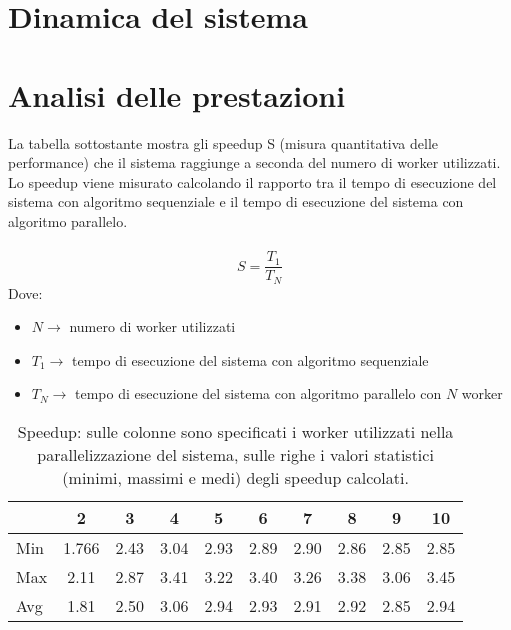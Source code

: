 \documentclass[a4paper]{article}
\begin{document}
\section{Dinamica del sistema}\label{dinamica-del-sistema}

\section{Analisi delle prestazioni}\label{analisi-delle-prestazioni}
La tabella sottostante mostra gli speedup S (misura quantitativa delle performance) che il sistema raggiunge a seconda del numero di worker utilizzati.\\
Lo speedup viene misurato calcolando il rapporto tra il tempo di esecuzione del sistema con algoritmo sequenziale e il tempo di esecuzione del sistema con algoritmo parallelo.\\\\
\begin{equation}
 S = \dfrac{T_1}{T_N}
\end{equation}
Dove:
\begin{itemize}
    \item $ N  \rightarrow$ numero di worker utilizzati
    \item $ T_1 \rightarrow$ tempo di esecuzione del sistema con algoritmo sequenziale
    \item $ T_N \rightarrow$ tempo di esecuzione del sistema con algoritmo parallelo con $N$ worker
\end{itemize}


\begin{table}[H]
\centering
\begin{tabular}{l|ccccccccc}
\hline
    & 2     & 3    & 4    & 5    & 6    & 7    & 8    & 9    & 10   \\ \hline
Min & 1.766 & 2.43 & 3.04 & 2.93 & 2.89 & 2.90 & 2.86 & 2.85 & 2.85 \\
Max & 2.11  & 2.87 & 3.41 & 3.22 & 3.40 & 3.26 & 3.38 & 3.06 & 3.45 \\
Avg & 1.81  & 2.50 & 3.06 & 2.94 & 2.93 & 2.91 & 2.92 & 2.85 & 2.94 \\ \hline
\end{tabular}
\caption{Speedup: sulle colonne sono specificati i worker utilizzati nella parallelizzazione del sistema, sulle righe i valori statistici (minimi, massimi e medi) degli speedup calcolati.}
\label{Tabella speedup del sistema}
\end{table}

\end{document}
